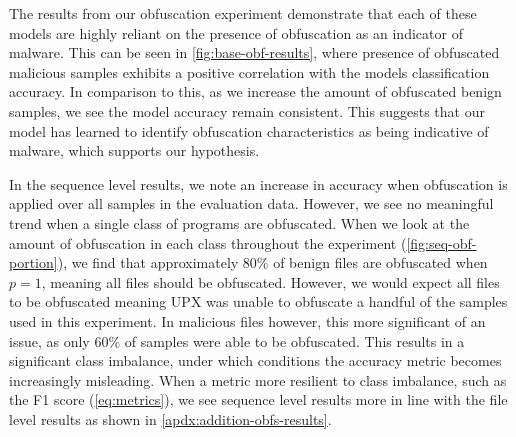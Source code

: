\documentclass[main.tex]{subfiles}
\begin{document}
The results from our obfuscation experiment demonstrate that each of these models are highly reliant on the presence of obfuscation as an indicator of malware. This can be seen in \cref{fig:base-obf-results}, where presence of obfuscated malicious samples exhibits a positive correlation with the models classification accuracy. In comparison to this, as we increase the amount of obfuscated benign samples, we see the model accuracy remain consistent. This suggests that our model has learned to identify obfuscation characteristics as being indicative of malware, which supports our hypothesis. 

In the sequence level results, we note an increase in accuracy when obfuscation is applied over all samples in the evaluation data. However, we see no meaningful trend when a single class of programs are obfuscated. When we look at the amount of obfuscation in each class throughout the experiment (\cref{fig:seq-obf-portion}), we find that approximately 80\% of benign files are obfuscated when \(p = 1\), meaning all files should be obfuscated. However, we would expect all files to be obfuscated meaning UPX was unable to obfuscate a handful of the samples used in this experiment. In malicious files however, this more significant of an issue, as only 60\% of samples were able to be obfuscated. This results in a significant class imbalance, under which conditions the accuracy metric becomes increasingly misleading. When a metric more resilient to class imbalance, such as the F1 score (\cref{eq:metrics}), we see sequence level results more in line with the file level results as shown in \cref{apdx:addition-obfs-results}.
\end{document}
